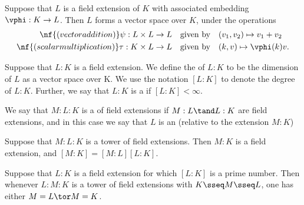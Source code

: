 \documentclass[a4paper]{article}
\begin{document}
\quad Suppose that \( L \) is a field extension of \( K \) with associated embedding \( \vphi: K \to L \).
  Then \( L \) forms a vector space over \( K \), under the operations \begin{align*}
    \nf{(vector addition) } \psi: L\times L &\to L \quad \text{given by} \quad (v_1,v_2) \mapsto v_1 + v_2 \\
    \nf{(scalar multiplication) } \tau : K\times  L &\to L \quad \text{given by} \quad (k,v) \mapsto \vphi(k)v.
  \end{align*}

\begin{tdefinition}
  Suppose that \( L: K \) is a field extension.
  We define the  of \( L: K \) to be the dimension of \( L \) as a vector space over K.
  We use the notation \( [L : K] \) to denote the degree of \( L : K \).
  Further, we say that \( L : K \) is a  if \( [L: K] <\infty \).
\end{tdefinition}

\begin{tdefinition}
  We say that \( M : L : K \) is a  of field extensions if \( M : L \tand L: K \) are field extensions, and in this case we say that \( L \) is an  (relative to the extension \( M : K \))
\end{tdefinition}

\begin{ttheorem}
  Suppose that \( M :L: K \) is a tower of field extensions.
  Then \( M : K \) is a field extension, and \( [M : K] = [M : L][L: K] \).
\end{ttheorem}

\begin{tcorollary}
  Suppose that \( L:K \) is a field extension for which \( [L: K] \) is a prime number.
  Then whenever \( L : M : K \) is a tower of field extensions with \( K \sseq M \sseq L \), one has either \( M= L \tor M= K \).
\end{tcorollary}
\end{document}
